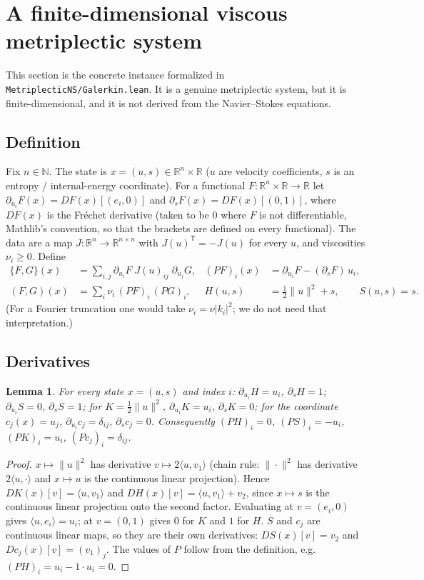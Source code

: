 \documentclass[11pt,a4paper]{article}
\newtheorem{lemma}[theorem]{Lemma}
\begin{document}
\section{A finite-dimensional viscous metriplectic system}\label{sec:galerkin}
This section is the concrete instance formalized in \texttt{MetriplecticNS/Galerkin.lean}. It is a
genuine metriplectic system, but it is finite-dimensional, and it is not derived from the Navier--Stokes
equations.

\subsection{Definition}
Fix \(n\in\mathbb{N}\). The state is \(x=(u,s)\in\mathbb{R}^n\times\mathbb{R}\) (\(u\) are velocity coefficients, \(s\) is an
entropy / internal-energy coordinate). For a functional \(F:\mathbb{R}^n\times\mathbb{R}\to\mathbb{R}\) let
\(\partial_{u_i}F(x)=DF(x)[(e_i,0)]\) and \(\partial_sF(x)=DF(x)[(0,1)]\), where \(DF(x)\) is the Fréchet
derivative (taken to be \(0\) where \(F\) is not differentiable, Mathlib's convention, so that the brackets
are defined on every functional). The data are a map \(J:\mathbb{R}^n\to\mathbb{R}^{n\times n}\) with
\(J(u)^{\mathsf T}=-J(u)\) for every \(u\), and viscosities \(\nu_i\ge0\). Define
\begin{align*}
\{F,G\}(x)&=\sum_{i,j}\partial_{u_i}F\;J(u)_{ij}\;\partial_{u_j}G, &
(PF)_i(x)&=\partial_{u_i}F-(\partial_sF)\,u_i,\\
(F,G)(x)&=\sum_i\nu_i\,(PF)_i\,(PG)_i, &
H(u,s)&=\tfrac12\|u\|^2+s,\qquad S(u,s)=s.
\end{align*}
(For a Fourier truncation one would take \(\nu_i=\nu|k_i|^2\); we do not need that interpretation.)

\subsection{Derivatives}
\begin{lemma}\label{lem:derivs}
For every state \(x=(u,s)\) and index \(i\):
\(\partial_{u_i}H=u_i\), \(\partial_sH=1\); \(\partial_{u_i}S=0\), \(\partial_sS=1\); for \(K=\tfrac12\|u\|^2\),
\(\partial_{u_i}K=u_i\), \(\partial_sK=0\); for the coordinate \(c_j(x)=u_j\), \(\partial_{u_i}c_j=\delta_{ij}\),
\(\partial_sc_j=0\). Consequently \((PH)_i=0\), \((PS)_i=-u_i\), \((PK)_i=u_i\), \((Pc_j)_i=\delta_{ij}\).
\end{lemma}
\begin{proof}
\(x\mapsto\|u\|^2\) has derivative \(v\mapsto2\langle u,v_1\rangle\) (chain rule: \(\|\cdot\|^2\) has derivative
\(2\langle u,\cdot\rangle\) and \(x\mapsto u\) is the continuous linear projection). Hence
\(DK(x)[v]=\langle u,v_1\rangle\) and \(DH(x)[v]=\langle u,v_1\rangle+v_2\), since \(x\mapsto s\) is the continuous linear
projection onto the second factor. Evaluating at \(v=(e_i,0)\) gives \(\langle u,e_i\rangle=u_i\); at \(v=(0,1)\)
gives \(0\) for \(K\) and \(1\) for \(H\). \(S\) and \(c_j\) are continuous linear maps, so they are their own
derivatives: \(DS(x)[v]=v_2\) and \(Dc_j(x)[v]=(v_1)_j\). The values of \(P\) follow from the definition, e.g.
\((PH)_i=u_i-1\cdot u_i=0\).
\end{proof}
\end{document}
